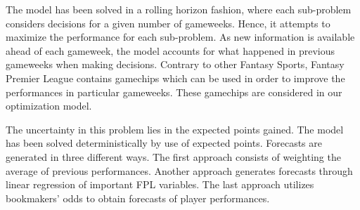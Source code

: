  
The model has been solved in a rolling horizon fashion, where each sub-problem considers decisions for a given number of gameweeks. Hence, it attempts to maximize the performance for each sub-problem. As new information is available ahead of each gameweek, the model accounts for what happened in previous gameweeks when making decisions. Contrary to other Fantasy Sports, Fantasy Premier League contains gamechips which can be used in order to improve the performances in particular gameweeks. These gamechips are considered in our optimization model.

\newpar

The uncertainty in this problem lies in the expected points gained. The model has been solved deterministically by use of expected points. Forecasts are generated in three different ways. The first approach consists of weighting the average of previous performances. Another approach generates forecasts through linear regression of important FPL variables. The last approach utilizes bookmakers' odds to obtain forecasts of player performances.



  
\clearpage

\begin{comment}
\pagestyle{fancy}
\fancyhf{}
\renewcommand{\chaptermark}[1]{\markboth{\chaptername\ \thechapter.\ #1}{}}
\renewcommand{\sectionmark}[1]{\markright{\thesection\ #1}}
\renewcommand{\headrulewidth}{0.1ex}
\renewcommand{\footrulewidth}{0.1ex}
\fancyfoot[LE,RO]{\thepage}
\fancyhead[LE]{\leftmark}
\fancyhead[RO]{\rightmark}
\fancypagestyle{plain}{\fancyhf{}\fancyfoot[LE,RO]{\thepage}\renewcommand{\headrulewidth}{0ex}}

\pagenumbering{arabic} 				
\setcounter{page}{1}
\end{comment}

\cleardoublepage